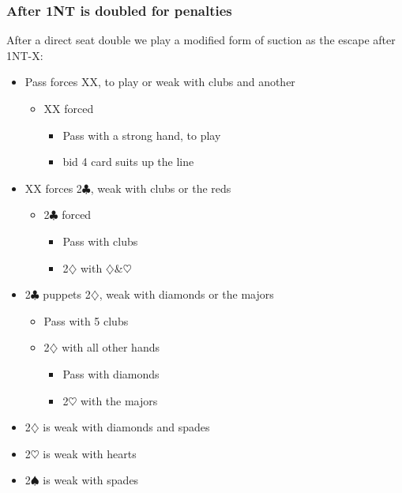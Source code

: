 \documentclass[a4paper,14pt]{extarticle}
\begin{document}
\newpage

\subsubsection{After 1NT is doubled for penalties}
\label{sec:resp:1nx}
\label{note:20}

After a direct seat double we play a modified form of suction as the escape after 1NT-X:

\begin{itemize}
\item Pass forces XX, to play or weak with clubs and another
	\begin{itemize}
	\item XX forced
		\begin{itemize}
		\item Pass with a strong hand, to play
		\item bid 4 card suits up the line
		\end{itemize}
	\end{itemize}
\item XX forces 2$\clubsuit$, weak with clubs or the reds
	\begin{itemize}
	\item 2$\clubsuit$ forced
		\begin{itemize}
		\item Pass with clubs
		\item 2$\diamondsuit$ with $\diamondsuit$\&$\heartsuit$
		\end{itemize}
	\end{itemize}
\item 2$\clubsuit$ puppets 2$\diamondsuit$, weak with diamonds or the majors
	\begin{itemize}
	\item Pass with 5 clubs
	\item 2$\diamondsuit$ with all other hands
		\begin{itemize}
		\item Pass with diamonds
		\item 2$\heartsuit$ with the majors
		\end{itemize}
	\end{itemize}
\item 2$\diamondsuit$ is weak with diamonds and spades
\item 2$\heartsuit$ is weak with hearts
\item 2$\spadesuit$ is weak with spades
\end{itemize}
\end{document}

